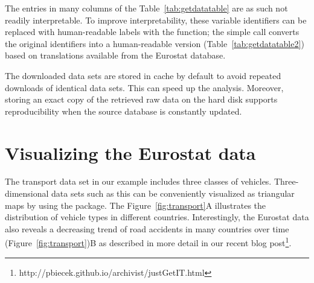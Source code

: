The entries in many columns of the Table~\ref{tab:getdatatable} are as
such not readily interpretable. To improve interpretability, these
variable identifiers can be replaced with human-readable labels with
the  function; the simple
call  converts the original identifiers
into a human-readable version (Table~\ref{tab:getdatatable2}) based on
translations available from the Eurostat database.

The downloaded data sets are stored in cache by default to avoid
repeated downloads of identical data sets. This can speed up the
analysis. Moreover, storing an exact copy of the retrieved raw data on
the hard disk supports reproducibility when the source database is
constantly updated.


\section{Visualizing the Eurostat data}

The transport data set in our example includes three classes of
vehicles. Three-dimensional data sets such as this can be conveniently
visualized as triangular maps by using
the  \citep{plotrix} package. The
Figure~\ref{fig:transport}A illustrates the distribution of vehicle
types in different countries. Interestingly, the Eurostat data also
reveals a decreasing trend of road accidents in many countries over
time (Figure~\ref{fig:transport})B as described in more detail in our
recent blog
post\footnote{http://pbiecek.github.io/archivist/justGetIT.html}.

